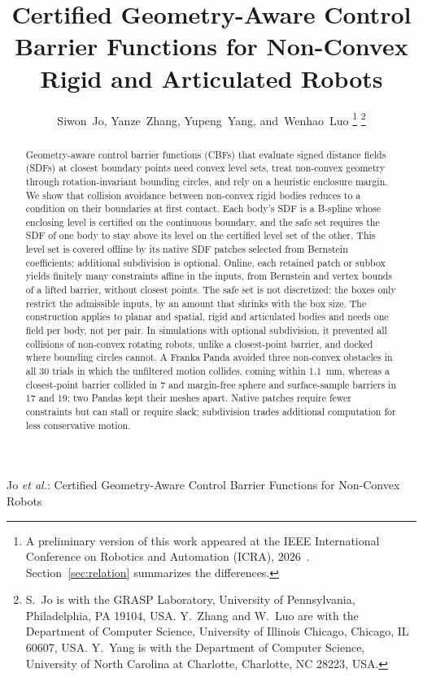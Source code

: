 \documentclass[journal]{IEEEtran}
\theoremstyle{definition}
\newif\ifanonymous
\begin{document}
\title{Certified Geometry-Aware Control Barrier Functions for Non-Convex Rigid and Articulated
Robots}

\ifanonymous
\author{Anonymous Authors}
\markboth{IEEE Transactions on Robotics}%
{Certified Geometry-Aware Control Barrier Functions for Non-Convex Robots}
\else
\author{Siwon~Jo, Yanze~Zhang, Yupeng~Yang, and~Wenhao~Luo%
\thanks{A preliminary version of this work appeared at the IEEE International Conference on
Robotics and Automation (ICRA), 2026~\cite{jo2026geometry}. Section~\ref{sec:relation}
summarizes the differences.}%
\thanks{S.~Jo is with the GRASP Laboratory, University of Pennsylvania, Philadelphia, PA 19104,
USA. Y.~Zhang and W.~Luo are with the Department of Computer Science, University of Illinois
Chicago, Chicago, IL 60607, USA. Y.~Yang is with the Department of Computer Science, University
of North Carolina at Charlotte, Charlotte, NC 28223, USA.}}

%
{Jo \MakeLowercase{\textit{et al.}}: Certified Geometry-Aware Control Barrier Functions for Non-Convex Robots}
\fi

\maketitle

\begin{abstract}
Geometry-aware control barrier functions (CBFs) that evaluate signed distance fields (SDFs) at
closest boundary points need convex level sets, treat non-convex geometry through rotation-invariant
bounding circles, and rely on a heuristic enclosure margin. We show that collision avoidance between
non-convex rigid bodies reduces to a condition on their boundaries at first contact. Each body's SDF
is a B-spline whose enclosing level is certified on the continuous boundary, and the safe set
requires the SDF of one body to stay above its level on the certified level set of the other. This
level set is covered offline by its native SDF patches selected from Bernstein coefficients;
additional subdivision is optional. Online, each retained patch or subbox yields
finitely many constraints affine in the inputs, from Bernstein and vertex bounds of a lifted barrier,
without closest points. The safe set is not discretized: the boxes only restrict the admissible
inputs, by an amount that shrinks with the box size. The construction applies to planar and
spatial, rigid and articulated bodies and needs one field per body, not per pair. In simulations
with optional subdivision, it
prevented all collisions of non-convex rotating robots, unlike a closest-point barrier, and docked
where bounding circles cannot. A Franka
Panda avoided three non-convex obstacles in all 30 trials in which the unfiltered motion collides,
coming within 1.1~mm, whereas a closest-point barrier collided in 7 and margin-free sphere and
surface-sample barriers in 17 and 19; two Pandas kept their meshes apart. Native patches require
fewer constraints but can stall or require slack; subdivision trades additional computation for
less conservative motion.
\end{abstract}
\end{document}
